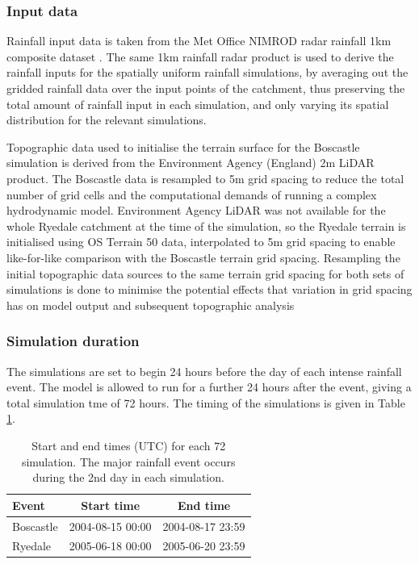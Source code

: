 \subsubsection{Input data}
Rainfall input data is taken from the Met Office NIMROD radar rainfall 1km composite dataset \citep{metoffice2003nimrod}. The same 1km rainfall radar product is used to derive the rainfall inputs for the spatially uniform rainfall simulations, by averaging out the gridded rainfall data over the input points of the catchment, thus preserving the total amount of rainfall input in each simulation, and only varying its spatial distribution for the relevant simulations.

Topographic data used to initialise the terrain surface for the Boscastle simulation is derived from the Environment Agency (England) 2m LiDAR product. The Boscastle data is resampled to 5m grid spacing to reduce the total number of grid cells and the  computational demands of running a complex hydrodynamic model. Environment Agency LiDAR was not available for the whole Ryedale catchment at the time of the simulation, so the Ryedale terrain is initialised using OS Terrain 50 data, interpolated to 5m grid spacing to enable like-for-like comparison with the Boscastle terrain grid spacing. Resampling the initial topographic data sources to the same terrain grid spacing for both sets of simulations is done to minimise the potential effects that variation in grid spacing has on model output and subsequent topographic analysis \citep[e.g][]{chang1991effect,schoorl2000three,haile2005effects,zhang2008effects}

\subsubsection{Simulation duration}

The simulations are set to begin 24 hours before the day of each intense rainfall event. The model is allowed to run for a further 24 hours after the event, giving a total simulation tme of 72 hours. The timing of the simulations is given in Table \ref{table_start_time_hydrog_sims}.

\begin{table}[htbp]
\begin{tabular}{l c  c}
\textbf{Event}  &   \textbf{Start time} &  \textbf{End time} \\
\hline 
Boscastle          &  2004-08-15 00:00  &  2004-08-17 23:59 \\
Ryedale             &  2005-06-18 00:00  &  2005-06-20 23:59 \\
\hline

\end{tabular}
\caption{Start and end times (UTC) for each 72 simulation. The major rainfall event occurs during the 2nd day in each simulation.}
\label{table_start_time_hydrog_sims}
\end{table}

